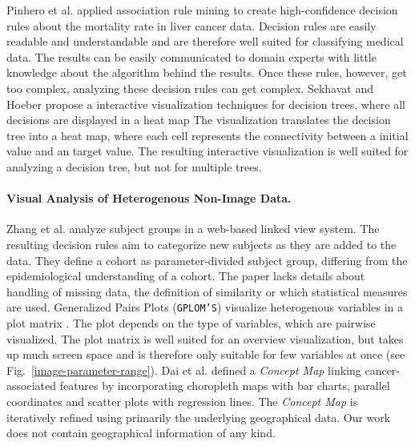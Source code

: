 \documentclass[a4paper,twoside]{style/article}
\begin{document}
Pinhero et al. \cite{Pinheiro} applied association rule mining to create high-confidence decision rules about the mortality rate in liver cancer data.
Decision rules are easily readable and understandable and are therefore well suited for classifying medical data.
The results can be easily communicated to domain experts with little knowledge about the algorithm behind the results.
Once these rules, however, get too complex, analyzing these decision rules can get complex.
Sekhavat and Hoeber \cite{Sekhavat} propose a interactive visualization techniques for decision trees, where all decisions are displayed in a heat map
The visualization translates the decision tree into a heat map, where each cell represents the connectivity between a initial value and an target value.
The resulting interactive visualization is well suited for analyzing a decision tree, but not for multiple trees.
\paragraph{Visual Analysis of Heterogenous Non-Image Data.}
Zhang et al. \cite{Zhang} analyze subject groups in a web-based linked view system.
The resulting decision rules aim to categorize new subjects as they are added to the data.
They define a cohort as parameter-divided subject group, differing from the epidemiological understanding of a cohort.
The paper lacks details about handling of missing data, the definition of similarity or which statistical measures are used.
Generalized Pairs Plots (\texttt{GPLOM'S}) visualize heterogenous variables in a plot matrix \cite{GPLOMS, Francois2013}.
The plot depends on the type of variables, which are pairwise visualized.
The plot matrix is well suited for an overview visualization, but takes up much screen space and is therefore only suitable for few variables at once (see Fig.~\ref{image-parameter-range}).
Dai et al. \cite{Dai} defined a \emph{Concept Map} linking cancer-associated features by incorporating choropleth maps with bar charts, parallel coordinates and scatter plots with regression lines.
The \emph{Concept Map} is iteratively refined using primarily the underlying geographical data.
Our work does not contain geographical information of any kind.
\end{document}
